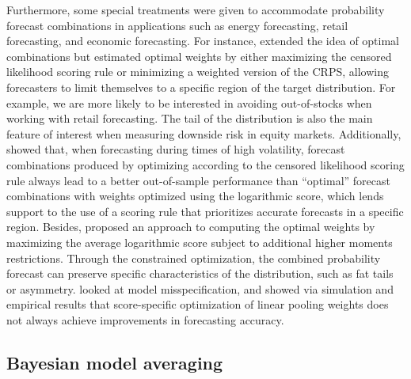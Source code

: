 \documentclass[a4paper,11pt]{article}
\begin{document}
Furthermore, some special treatments were given to accommodate probability forecast combinations in applications such as energy forecasting, retail forecasting, and economic forecasting. For instance, \citet{Opschoor2017-yu} extended the idea of optimal combinations but estimated optimal weights by either maximizing the censored likelihood scoring rule \citep{Diks2011-gj} or minimizing a weighted version of the CRPS, allowing forecasters to limit themselves to a specific region of the target distribution. For example, we are more likely to be interested in avoiding out-of-stocks when working with retail forecasting. The tail of the distribution is also the main feature of interest when measuring downside risk in equity markets. Additionally, \citet{Zischke2022-sv} showed that, when forecasting during times of high volatility, forecast combinations produced by optimizing according to the censored likelihood scoring rule always lead to a better out-of-sample performance than ``optimal'' forecast combinations with weights optimized using the logarithmic score, which lends support to the use of a scoring rule that prioritizes accurate forecasts in a specific region. Besides, \citet{Pauwels2020-zl} proposed an approach to computing the optimal weights by maximizing the average logarithmic score subject to additional higher moments restrictions. Through the constrained optimization, the combined probability forecast can preserve specific characteristics of the distribution, such as fat tails or asymmetry. \citet{Martin2021-yi} looked at model misspecification, and showed via simulation and empirical results that score-specific optimization of linear pooling weights does not always achieve improvements in forecasting accuracy.

\subsection{Bayesian model averaging}
\label{sec:bma}
\end{document}
